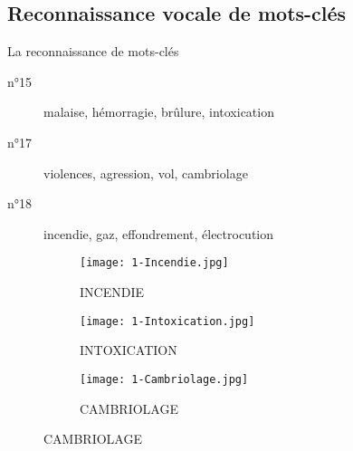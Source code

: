 \subsection{Reconnaissance vocale de mots-clés}


\begin{frame}{La reconnaissance de mots-clés}
	\begin{block}{}
		\begin{description}
			\item[n°15] malaise, hémorragie, brûlure, intoxication
			\item[n°17] violences, agression, vol, cambriolage
			\item[n°18] incendie, gaz, effondrement, électrocution
		\end{description}
	\end{block}
	\begin{figure}
		\begin{subfigure}[]{0.31\textwidth}
			\texttt{[image: 1-Incendie.jpg]}
			\caption{INCENDIE}
		\end{subfigure}
		\begin{subfigure}[]{0.31\textwidth}
			\texttt{[image: 1-Intoxication.jpg]}
			\caption{INTOXICATION}
		\end{subfigure}
		\begin{subfigure}[]{0.31\textwidth}
			\texttt{[image: 1-Cambriolage.jpg]}
			\caption{CAMBRIOLAGE}
		\end{subfigure}
	\end{figure}
\end{frame}


